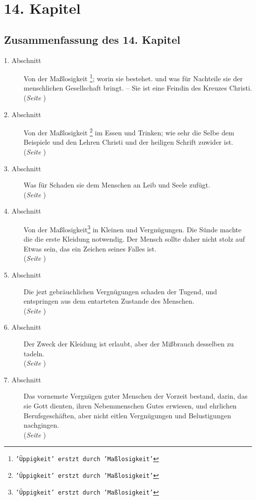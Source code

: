 
\chapter{14. Kapitel} \label{kap14}

\section{Zusammenfassung des 14. Kapitel}
\footnotesize
\begin{description}
\item[1. Abschnitt] Von der Maßlosigkeit
\footnote{\texttt{'Üppigkeit' erstzt durch 'Maßlosigkeit'}};
worin sie bestehet. und was für Nachteile
sie der menschlichen Gesellschaft bringt. -- Sie ist eine Feindin des Kreuzes
Christi.
\\(\textit{Seite \pageref{kap14_ab1}})
\item[2. Abschnitt] Von der Maßlosigkeit
\footnote{\texttt{'Üppigkeit' erstzt durch 'Maßlosigkeit'}}
im Essen und Trinken; wie sehr die Selbe
dem Beispiele und den Lehren Christi und der heiligen Schrift zuwider ist.
\\(\textit{Seite \pageref{kap14_ab2}})
\item[3. Abschnitt] Was für Schaden sie dem Menschen an Leib und Seele zufügt.
\\(\textit{Seite \pageref{kap14_ab3}})
\item[4. Abschnitt] Von der Maßlosigkeit\footnote{\texttt{'Üppigkeit' erstzt durch 'Maßlosigkeit'}} in Kleinen und Vergnügungen. Die Sünde
machte die die erste Kleidung notwendig. Der Mensch sollte daher nicht stolz auf
Etwas sein, das ein Zeichen seines Falles ist.
\\(\textit{Seite \pageref{kap14_ab4}})
\item[5. Abschnitt] Die jezt gebräuchlichen Vergnügungen schaden der Tugend, und
entspringen aus dem entarteten Zustande des Menschen.
\\(\textit{Seite \pageref{kap14_ab5}})
\item[6. Abschnitt] Der Zweck der Kleidung ist erlaubt, aber der Mißbrauch
desselben zu tadeln.
\\(\textit{Seite \pageref{kap14_ab6}})
\item[7. Abschnitt] Das vornemste Vergnügen guter Menschen der Vorzeit bestand,
darin, das sie Gott dienten, ihren Nebemmenschen Gutes erwiesen, und ehrlichen
Berufsgeschäften, aber nicht eitlen Vergnügungen und Belustigungen nachgingen.
\\(\textit{Seite \pageref{kap14_ab7}})

\end{description}
